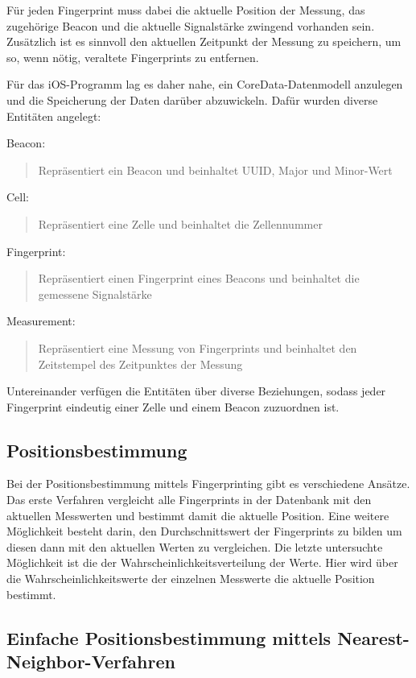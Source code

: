 Für jeden Fingerprint muss dabei die aktuelle Position der Messung, das zugehörige Beacon und die aktuelle Signalstärke zwingend vorhanden sein.
Zusätzlich ist es sinnvoll den aktuellen Zeitpunkt der Messung zu speichern, um so, wenn nötig, veraltete Fingerprints zu entfernen. 

Für das iOS-Programm lag es daher nahe, ein CoreData-Datenmodell anzulegen und die Speicherung der Daten darüber abzuwickeln.
Dafür wurden diverse Entitäten angelegt:

Beacon:
	\begin{quote}Repräsentiert ein Beacon und beinhaltet UUID, Major und Minor-Wert\end{quote}
Cell:
	\begin{quote}Repräsentiert eine Zelle und beinhaltet die Zellennummer\end{quote}
Fingerprint:
	\begin{quote}Repräsentiert einen Fingerprint eines Beacons und beinhaltet die gemessene Signalstärke\end{quote}
Measurement:
	\begin{quote}Repräsentiert eine Messung von Fingerprints und beinhaltet den Zeitstempel des Zeitpunktes der Messung\end{quote}

Untereinander verfügen die Entitäten über diverse Beziehungen, sodass jeder Fingerprint eindeutig einer Zelle und einem Beacon zuzuordnen ist.

\subsection{Positionsbestimmung}
\label{sec:implementation:fingerprinting:positioning}
Bei der Positionsbestimmung mittels Fingerprinting gibt es verschiedene Ansätze.
Das erste Verfahren vergleicht alle Fingerprints in der Datenbank mit den aktuellen Messwerten und bestimmt damit die aktuelle Position.
Eine weitere Möglichkeit besteht darin, den Durchschnittswert der Fingerprints zu bilden um diesen dann mit den aktuellen Werten zu vergleichen.
Die letzte untersuchte Möglichkeit ist die der Wahrscheinlichkeitsverteilung der Werte. Hier wird über die Wahrscheinlichkeitswerte der einzelnen Messwerte die aktuelle Position bestimmt.

\subsection{Einfache Positionsbestimmung mittels Nearest-Neighbor-Verfahren}
\label{sec:implementation:fingerprinting:positioning:naiv}

